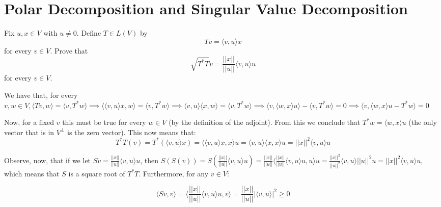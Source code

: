 \section{Polar Decomposition and Singular Value Decomposition}

\begin{exercise}{1}
    Fix $u, x \in V$ with $u \neq 0$. Define $T \in L(V)$ by
    $$Tv = \langle v, u \rangle x$$
    for every $v \in V$. Prove that
    $$\sqrt{T^*T}v = \frac{\lvert \lvert x \rvert \rvert}{\lvert \lvert u \rvert \rvert}\langle v, u \rangle u$$
    for every $v \in V$.
\end{exercise}

\begin{solution}

    We have that, for every $v, w \in V, \langle Tv, w \rangle = \langle v, T^*w \rangle \implies \langle \langle v, u \rangle x, w \rangle = \langle v, T^*w \rangle \implies \langle v, u \rangle \langle x, w \rangle = \langle v, T^*w \rangle \implies \langle v, \langle w, x \rangle u \rangle - \langle v, T^*w \rangle = 0 \implies \langle v, \langle w, x \rangle u - T^*w \rangle = 0$    

    Now, for a fixed $v$ this must be true for every $w \in V$ (by the definition of the adjoint). From this we conclude that $T^*w = \langle w, x \rangle u$ (the only vector that is in $V^\bot$ is the zero vector). This now means that:
    $$T^*T(v) = T^*(\langle v, u \rangle x) = \langle \langle v, u \rangle x, x \rangle u = \langle v, u \rangle \langle x, x \rangle u = \lvert \lvert x \rvert \rvert^2 \langle v, u \rangle u$$

    Observe, now, that if we let $Sv = \frac{\lvert \lvert x \rvert \rvert}{\lvert \lvert u \rvert \rvert}\langle v, u \rangle u$, then $S(S(v)) = S( \frac{\lvert \lvert x \rvert \rvert}{\lvert \lvert u \rvert \rvert}\langle v, u \rangle u) = \frac{\lvert \lvert x \rvert \rvert}{\lvert \lvert u \rvert \rvert} \langle \frac{\lvert \lvert x \rvert \rvert}{\lvert \lvert u \rvert \rvert} \langle v, u \rangle u, u \rangle u = \frac{\lvert \lvert x \rvert \rvert^2}{\lvert \lvert u \rvert \rvert^2}\langle v, u \rangle \lvert \lvert u \rvert \rvert^2 u = \lvert \lvert x \rvert \rvert^2 \langle v, u \rangle u$, which means that $S$ is a square root of $T^*T$. Furthermore, for any $v \in V$:

    $$\langle Sv, v \rangle = \langle \frac{\lvert \lvert x \rvert \rvert}{\lvert \lvert u \rvert \rvert}\langle v, u \rangle u, v \rangle = \frac{\lvert \lvert x \rvert \rvert}{\lvert \lvert u \rvert \rvert} \lvert \langle v, u \rangle \rvert^2 \geq 0$$


\end{solution}
